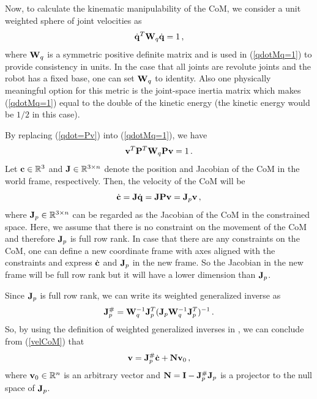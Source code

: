 Now, to calculate the kinematic manipulability of the CoM, we consider a unit
weighted sphere of joint velocities as
%
\begin{equation}
  \dot{\mathbf{q}}^T \mathbf{W}_q \dot{\mathbf{q}} = 1 \, ,
  \label{qdotMq=1}
\end{equation}
%
where $\mathbf{W}_q$ is a symmetric positive definite matrix and is used in
(\ref{qdotMq=1}) to provide consistency in units.  In the case that all joints
are revolute joints and the robot has a fixed base, one can set $\mathbf{W}_q$ to
identity.  Also one physically meaningful option for this metric is the
joint-space inertia matrix which makes (\ref{qdotMq=1}) equal to the double of
the kinetic energy (the kinetic energy would be $1/2$ in this case).

By replacing (\ref{qdot=Pv}) into (\ref{qdotMq=1}), we have
%
\begin{equation}
  \mathbf{v}^T \mathbf{P}^T \mathbf{W}_q \mathbf{P} \mathbf{v} = 1 \, .
  \label{vPMq=1}
\end{equation}
%
Let $\mathbf{c} \in \mathbb{R}^3$ and $\mathbf{J} \in \mathbb{R}^{3 \times n}$ denote the position and
Jacobian of the CoM \cite{Sugihara&Nakamura02} in the world frame,
respectively.  Then, the velocity of the CoM will be
%
\begin{equation}
  \dot{\mathbf{c}} = \mathbf{J} \dot{\mathbf{q}} = \mathbf{J} \mathbf{P} \mathbf{v} = \mathbf{J}_p \mathbf{v} \, ,
  \label{velCoM}
\end{equation}
%
where $\mathbf{J}_p \in \mathbb{R}^{3 \times n}$ can be regarded as the Jacobian of the CoM
in the constrained space.  Here, we assume that there is no constraint on the
movement of the CoM and therefore $\mathbf{J}_p$ is full row rank.  In case that
there are any constraints on the CoM, one can define a new coordinate frame
with axes aligned with the constraints and express $\dot{\mathbf{c}}$ and $\mathbf{J}_p$ in
the new frame.  So the Jacobian in the new frame will be full row rank but it
will have a lower dimension than $\mathbf{J}_p$.

Since $\mathbf{J}_p$ is full row rank, we can write its weighted generalized inverse
as
%
\begin{equation}
  \mathbf{J}_p^\# = \mathbf{W}_q^{-1} \mathbf{J}_p^T (\mathbf{J}_p \mathbf{W}_q^{-1} \mathbf{J}_p^T)^{-1} \, .
  \label{Jpinv}
\end{equation}
%
So, by using the definition of weighted generalized inverses in
\cite{Dotyetal93}, we can conclude from (\ref{velCoM}) that
%
\begin{equation}
  \mathbf{v} = \mathbf{J}_p^\# \dot{\mathbf{c}} + \mathbf{N} \mathbf{v}_0 \, ,
  \label{v=JPcdot}
\end{equation}
%
where $\mathbf{v}_0 \in \mathbb{R}^n$ is an arbitrary vector and $\mathbf{N} = \mathbf{I} - \mathbf{J}_p^\# \mathbf{J}_p$
is a projector to the null space of $\mathbf{J}_p$.

